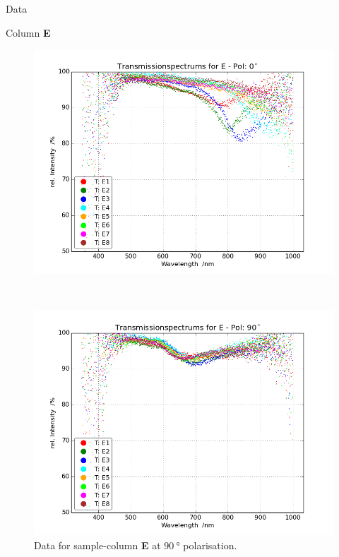 \begin{appendix}
\begin{chapter}{Data}
\begin{section}{Column \textbf{E}}
      \begin{figure}[ht!]
        \centering
        \begin{minipage}{.92\textwidth}
          \centering
          \includegraphics[width=\textwidth]{Figures/TransspecRAW_EPol0.png}
          \caption{Data for sample-column \textbf{E} at $\SI{0}{\degree}$
              polarisation.}
          \label{fig:TransspecRAW_EPol0}
        \end{minipage}\\
        \begin{minipage}{.92\textwidth}
          \centering
          \includegraphics[width=\textwidth]{Figures/TransspecRAW_EPol90.png}
          \caption{Data for sample-column \textbf{E} at $\SI{90}{\degree}$
              polarisation.}
          \label{fig:TransspecRAW_EPol90}
        \end{minipage}
      \end{figure}
      
    \end{section}
    
  \end{chapter}
  
\end{appendix}
 